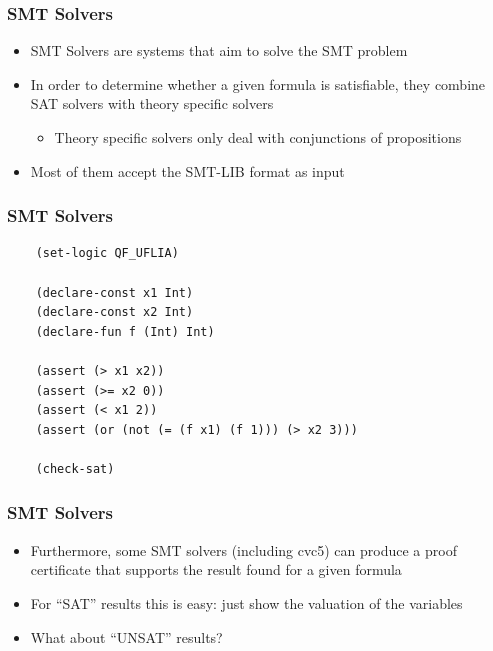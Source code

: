 \documentclass[usepdftitle=false,aspectratio=169,usenames,dvipsnames]{beamer}
\newcommand\vitem{\vfill\item}
\begin{document}
\begin{frame}
  \frametitle{SMT Solvers}
  \begin{itemize}
    \item SMT Solvers are systems that aim to solve the SMT problem
    \vitem In order to determine whether a given formula is satisfiable, they combine SAT solvers with theory specific solvers
    \begin{itemize}
      \item Theory specific solvers only deal with conjunctions of propositions
    \end{itemize}
    \vitem Most of them accept the SMT-LIB format as input
  \end{itemize}
\end{frame}

\begin{frame}[fragile]
  \frametitle{SMT Solvers}
  \begin{verbatim}
    (set-logic QF_UFLIA)

    (declare-const x1 Int)
    (declare-const x2 Int)
    (declare-fun f (Int) Int)

    (assert (> x1 x2))
    (assert (>= x2 0))
    (assert (< x1 2))
    (assert (or (not (= (f x1) (f 1))) (> x2 3)))

    (check-sat)
  \end{verbatim}
\end{frame}

\begin{frame}
  \frametitle{SMT Solvers}
  \begin{itemize}
    \item Furthermore, some SMT solvers (including cvc5) can produce a proof certificate that supports the result found for a given formula
    \vitem For ``SAT'' results this is easy: just show the valuation of the variables
    \vitem What about ``UNSAT'' results?
  \end{itemize}
\end{frame}

\end{document}
